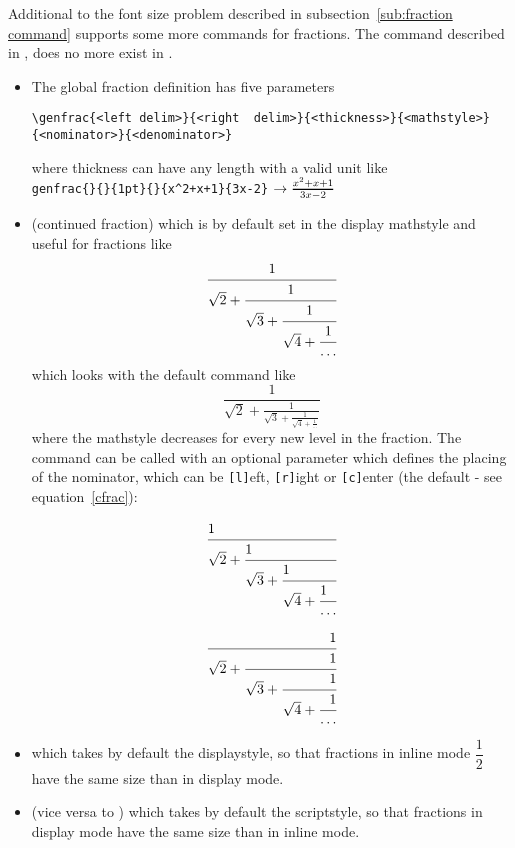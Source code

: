 \begin{table}[htb]
Additional to the font size problem described in subsection~\vref{sub:fraction command}
\AmSmath supports some more commands for fractions. The  command
described in \cite{MathGuide}, does no more exist in \AmSmath.    %

\begin{itemize}
\item The global fraction definition has five parameters
\begin{lstlisting}[xleftmargin=-1em,xrightmargin=-1em]
\genfrac{<left delim>}{<right  delim>}{<thickness>}{<mathstyle>}{<nominator>}{<denominator>}
\end{lstlisting}
where thickness can have any length with a valid unit like \\
\verb|genfrac{}{}{1pt}{}{x^2+x+1}{3x-2}|
$\rightarrow\genfrac{}{}{1pt}{}{x^2+x+1}{3x-2}$
\item {} (continued fraction) which is
by default set in the display mathstyle and useful for fractions like
\begin{equation}
\cfrac{1}{\sqrt{2}+\cfrac{1}{\sqrt{3}+\cfrac{1}{\sqrt{4}+\cfrac{1}{\ldots}}}}\label{cfrac}
\end{equation}
which looks with the default  command like
\begin{equation}
	\frac{1}{\sqrt{2}+\frac{1}{\sqrt{3}+\frac{1}{\sqrt{4}+\frac{1}{\ldots}}}}
\end{equation}
where the mathstyle decreases for every new level in the fraction.
The  command can be called with an optional
parameter which defines the placing of the nominator, which can be
\texttt{[l]}eft, \texttt{[r]}ight or \texttt{[c]}enter (the default - see
equation~\ref{cfrac}):\\
\begin{minipage}[c]{0.40\textwidth}%
\[
\cfrac[l]{1}{\sqrt{2}+\cfrac[l]{1}{\sqrt{3}+\cfrac[l]{1}{\sqrt{4}+\cfrac[l]{1}{\ldots}}}}
\]
\end{minipage}%
\hfill{}\begin{minipage}[c]{0.40\textwidth}%
\[\cfrac[r]{1}{\sqrt{2}+\cfrac[r]{1}{\sqrt{3}+\cfrac[r]{1}{\sqrt{4}+\cfrac[r]{1}{\ldots}}}}\]
\end{minipage}%

\item {}
which takes by default the displaystyle, so that
fractions in inline mode $\dfrac{1}{2}$ have the same size than in
display mode.
\item {} (vice versa to ) which takes by default
the scriptstyle, so that fractions in display
mode have the same size than in inline mode.
\end{itemize}


\end{table}
